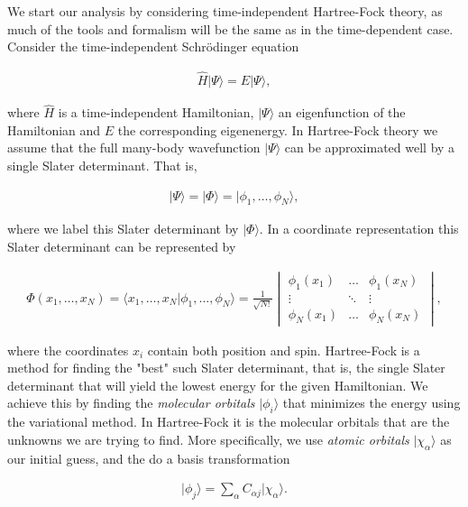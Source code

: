 \documentclass[%
oneside,                 %
final,                   %
10pt]{article}
\begin{document}
We start our analysis by considering time-independent Hartree-Fock theory, as
much of the tools and formalism will be the same as in the time-dependent case.
Consider the time-independent Schrödinger equation

\begin{align}
    \hat{H}\vert\Psi\rangle = E\vert\Psi\rangle,
\end{align}

where $\hat{H}$ is a time-independent Hamiltonian, $\vert\Psi\rangle$ an
eigenfunction of the Hamiltonian and $E$ the corresponding eigenenergy. In
Hartree-Fock theory we assume that the full many-body wavefunction
$\vert\Psi\rangle$ can be approximated well by a single Slater determinant. That
is,

\begin{align}
    \vert\Psi\rangle = \vert\Phi\rangle = \vert\phi_1, \dots, \phi_N\rangle,
\end{align}

where we label this Slater determinant by $\vert\Phi\rangle$. In a coordinate
representation this Slater determinant can be represented by

\begin{align}
    \Phi(x_1, \dots, x_N)
    = \langle x_1, \dots, x_N \vert \phi_1, \dots, \phi_N \rangle
    = \frac{1}{\sqrt{N!}}
    \begin{vmatrix}
        \phi_1(x_1) & \dots & \phi_1(x_N) \\
        \vdots & \ddots & \vdots \\
        \phi_N(x_1) & \dots & \phi_N(x_N)
    \end{vmatrix},
\end{align}

where the coordinates $x_i$ contain both position and spin. Hartree-Fock is a
method for finding the "best" such Slater determinant, that is, the single
Slater determinant that will yield the lowest energy for the given Hamiltonian.
We achieve this by finding the \emph{molecular orbitals} $\vert\phi_i\rangle$
that minimizes the energy using the variational method. In Hartree-Fock it is
the molecular orbitals that are the unknowns we are trying to find. More
specifically, we use \emph{atomic orbitals} $\vert\chi_{\alpha}\rangle$ as our
initial guess, and the do a basis transformation

\begin{align}
    \vert\phi_j\rangle = \sum_{\alpha} C_{\alpha j}\vert\chi_{\alpha}\rangle.
\end{align}
\end{document}
